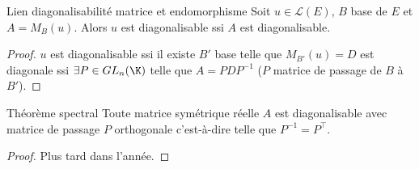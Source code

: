 \begin{proposition}{Lien diagonalisabilité matrice et endomorphisme}{}
    Soit $u \in \mathscr L(E)$, $B$ base de $E$ et $A = M_B(u)$. Alors $u$ est diagonalisable ssi $A$ est diagonalisable.
\end{proposition}

\begin{proof}
    $u$ est diagonalisable ssi il existe $B'$ base telle que $M_{B'}(u) = D$ est diagonale
    ssi $\exists P \in GL_n(\K)$ telle que $A = P D P^{-1}$ ($P$ matrice de passage de $B$ à $B'$).
\end{proof}

\begin{theoreme}{Théorème spectral}{}
    Toute matrice symétrique réelle $A$ est diagonalisable avec matrice de passage $P$ orthogonale
    c'est-à-dire telle que $P^{-1} = P^\top$.    
\end{theoreme}

\begin{proof}
    Plus tard dans l'année. 
\end{proof}

